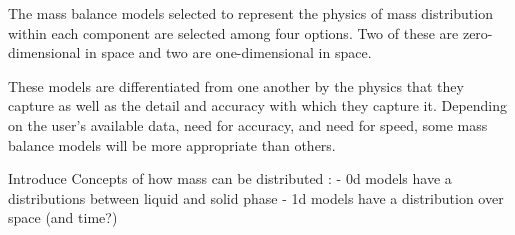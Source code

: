 The mass balance models selected to represent the physics of mass distribution 
within each component are selected among four options. Two of these are 
zero-dimensional in space and two are one-dimensional in space. 

These models are differentiated from one another by the physics that they 
capture as well as the detail and accuracy with which they capture it. 
Depending on the user's available data, need for accuracy, and need for speed, 
some mass balance models will be more appropriate than others. 






Introduce Concepts of how mass can be distributed : 
- 0d models have a distributions between liquid and solid phase
- 1d models have a distribution over space (and time?)
